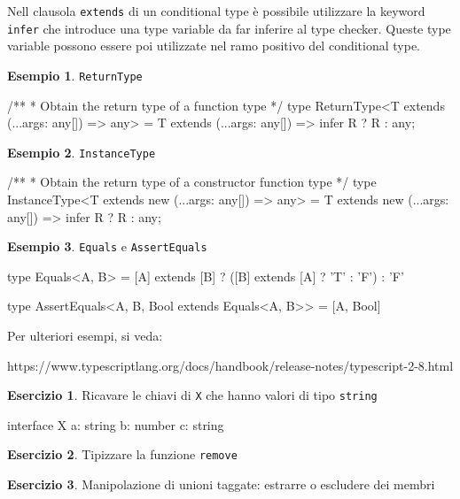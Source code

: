 \documentclass[12pt]{article}
\theoremstyle{definition}
\newtheorem{example}{Esempio}[subsection]
\newtheorem{exercise}{Esercizio}[subsection]
\newenvironment{code}
  {\vspace{0.5cm} \VerbatimEnvironment\begin{typescriptcode}}
  {\end{typescriptcode} \vspace{0.2cm}}
\begin{document}
Nell clausola \texttt{extends} di un conditional type è possibile utilizzare la keyword \texttt{infer} che introduce
una type variable da far inferire al type checker. Queste type variable possono essere poi utilizzate nel ramo positivo
del conditional type.

\begin{example}
\texttt{ReturnType}

\begin{code}
/**
 * Obtain the return type of a function type
 */
type ReturnType<T extends (...args: any[]) => any> =
  T extends (...args: any[]) => infer R ? R : any;
\end{code}
\end{example}

\begin{example}
\texttt{InstanceType}

\begin{code}
/**
 * Obtain the return type of a constructor function type
 */
type InstanceType<T extends new (...args: any[]) => any> =
  T extends new (...args: any[]) => infer R ? R : any;
\end{code}
\end{example}

\begin{example}
\texttt{Equals} e \texttt{AssertEquals}

\begin{code}
type Equals<A, B> = [A] extends [B] ?
  ([B] extends [A] ? 'T' : 'F') : 'F'

type AssertEquals<A, B, Bool extends Equals<A, B>> = [A, Bool]
\end{code}
\end{example}

Per ulteriori esempi, si veda:

https://www.typescriptlang.org/docs/handbook/release-notes/typescript-2-8.html

\begin{exercise}
Ricavare le chiavi di \texttt{X} che hanno valori di tipo \texttt{string}

\begin{code}
interface X {
  a: string
  b: number
  c: string
}
\end{code}
\end{exercise}

\begin{exercise}
Tipizzare la funzione \texttt{remove}
\end{exercise}

\begin{exercise}
Manipolazione di unioni taggate: estrarre o escludere dei membri
\end{exercise}
\end{document}
